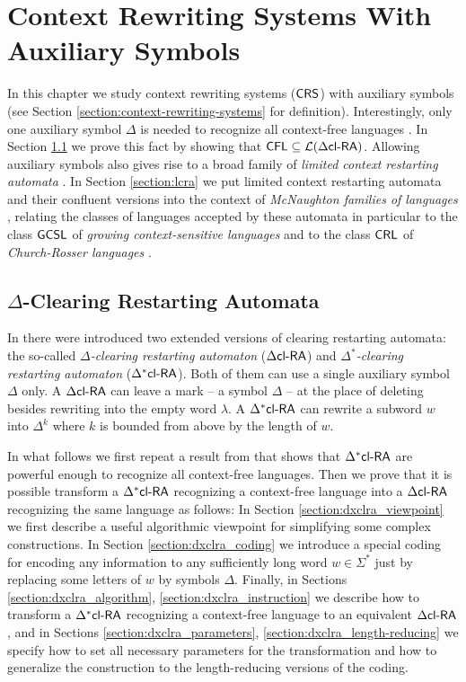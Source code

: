 \chapter{Context Rewriting Systems With Auxiliary Symbols}\label{chapter:crs_aux}

In this chapter we study context rewriting systems ($\textup{\sf CRS\/}$) with auxiliary symbols (see Section \ref{section:context-rewriting-systems} for definition). Interestingly, only one auxiliary symbol $\Delta$ is needed to recognize all context-free languages \cite{CM11}. In Section \ref{section:dxclra} we prove this fact by showing that $\textup{\sf CFL} \subseteq {\cal L}(\textup{\sf $\Delta$cl-RA\/})$. Allowing auxiliary symbols also gives rise to a broad family of \emph{limited context restarting automata} \cite{B11,OCM13}. In Section \ref{section:lcra} we put limited context restarting automata and their confluent versions into the context of \emph{McNaughton families of languages} \cite{Beaudry2003}, relating the classes of languages accepted by these automata in particular to the class $\textup{\sf GCSL}$ of \emph{growing context-sensitive languages} \cite{Buntrock19981,Dahlhaus1986} and to the class $\textup{\sf CRL}$ of \emph{Church-Rosser languages} \cite{MNO88}.

\section{$\Delta$-Clearing Restarting Automata}\label{section:dxclra}

In \cite{CM10} there were introduced two extended versions of clearing restarting automata: the so-called \emph{$\Delta$-clearing restarting automaton} (\index{$\DclRA$}$\DclRA$) and \emph{$\Delta^*$-clearing restarting automaton} (\index{$\DXclRA$}$\DXclRA$). Both of them can use a single auxiliary symbol $\Delta$ only. A $\DclRA$ can leave a mark -- a symbol $\Delta$ -- at the place of deleting besides rewriting into the empty word $\lambda$. A $\DXclRA$ can rewrite a subword $w$ into $\Delta^k$ where $k$ is bounded from above by the length of $w$. 

In what follows we first repeat a result from \cite{CM10} that shows that $\DXclRA$ are powerful enough to recognize  all context-free languages. Then we prove that it is possible transform a $\DXclRA$ recognizing a context-free language into a $\DclRA$ recognizing the same language \cite{CM11, CM11tech} as follows: In Section \ref{section:dxclra_viewpoint} we first describe a useful algorithmic viewpoint for simplifying some complex constructions. In Section \ref{section:dxclra_coding} we introduce a special coding for encoding any information to any sufficiently long word $w \in \Sigma^*$ just by replacing some letters of $w$ by symbols $\Delta$. Finally, in Sections \ref{section:dxclra_algorithm}, \ref{section:dxclra_instruction} we describe how to transform a $\DXclRA$ recognizing a context-free language to an equivalent $\DclRA$, and in Sections \ref{section:dxclra_parameters}, \ref{section:dxclra_length-reducing} we specify how to set all necessary parameters for the transformation and how to generalize the construction to the length-reducing versions of the coding.

